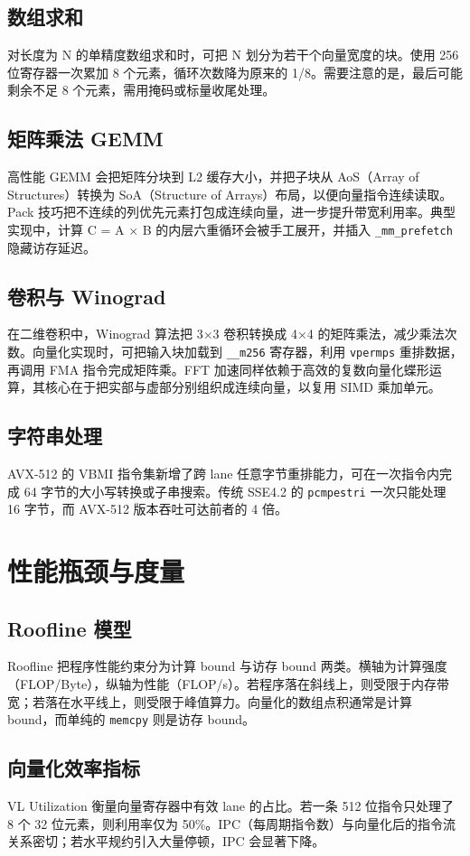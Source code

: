 \section{数组求和}
对长度为 N 的单精度数组求和时，可把 N 划分为若干个向量宽度的块。使用 256 位寄存器一次累加 8 个元素，循环次数降为原来的 1/8。需要注意的是，最后可能剩余不足 8 个元素，需用掩码或标量收尾处理。\par
\section{矩阵乘法 GEMM}
高性能 GEMM 会把矩阵分块到 L2 缓存大小，并把子块从 AoS（Array of Structures）转换为 SoA（Structure of Arrays）布局，以便向量指令连续读取。Pack 技巧把不连续的列优先元素打包成连续向量，进一步提升带宽利用率。典型实现中，计算 C = A × B 的内层六重循环会被手工展开，并插入 \texttt{\_{}mm\_{}prefetch} 隐藏访存延迟。\par
\section{卷积与 Winograd}
在二维卷积中，Winograd 算法把 3×3 卷积转换成 4×4 的矩阵乘法，减少乘法次数。向量化实现时，可把输入块加载到 \texttt{\_{}\_{}m256} 寄存器，利用 \texttt{vpermps} 重排数据，再调用 FMA 指令完成矩阵乘。FFT 加速同样依赖于高效的复数向量化蝶形运算，其核心在于把实部与虚部分别组织成连续向量，以复用 SIMD 乘加单元。\par
\section{字符串处理}
AVX-512 的 VBMI 指令集新增了跨 lane 任意字节重排能力，可在一次指令内完成 64 字节的大小写转换或子串搜索。传统 SSE4.2 的 \texttt{pcmpestri} 一次只能处理 16 字节，而 AVX-512 版本吞吐可达前者的 4 倍。\par
\chapter{性能瓶颈与度量}
\section{Roofline 模型}
Roofline 把程序性能约束分为计算 bound 与访存 bound 两类。横轴为计算强度（FLOP/Byte），纵轴为性能（FLOP/s）。若程序落在斜线上，则受限于内存带宽；若落在水平线上，则受限于峰值算力。向量化的数组点积通常是计算 bound，而单纯的 \texttt{memcpy} 则是访存 bound。\par
\section{向量化效率指标}
VL Utilization 衡量向量寄存器中有效 lane 的占比。若一条 512 位指令只处理了 8 个 32 位元素，则利用率仅为 50\%{}。IPC（每周期指令数）与向量化后的指令流关系密切；若水平规约引入大量停顿，IPC 会显著下降。\par
